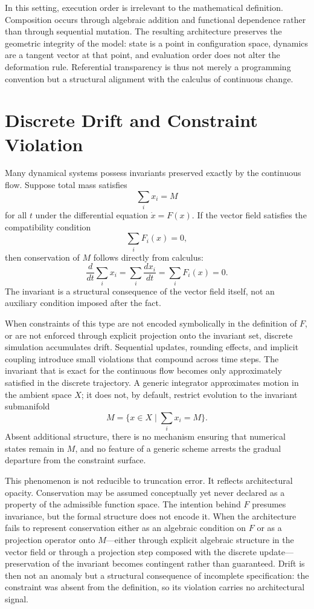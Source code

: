 \documentclass[12pt]{book}
\begin{document}
In this setting, execution order is irrelevant to the mathematical
definition. Composition occurs through algebraic addition and
functional dependence rather than through sequential mutation. The
resulting architecture preserves the geometric integrity of the model:
state is a point in configuration space, dynamics are a tangent vector
at that point, and evaluation order does not alter the deformation
rule. Referential transparency is thus not merely a programming
convention but a structural alignment with the calculus of continuous
change.

\section{Discrete Drift and Constraint Violation}

Many dynamical systems possess invariants preserved exactly by the continuous
flow. Suppose total mass satisfies
\[
  \sum_i x_i = M
\]
for all $t$ under the differential equation $\dot{x} = F(x)$. If the vector
field satisfies the compatibility condition
\[
  \sum_i F_i(x) = 0,
\]
then conservation of $M$ follows directly from calculus:
\[
  \frac{d}{dt}\sum_i x_i
  = \sum_i \frac{dx_i}{dt}
  = \sum_i F_i(x)
  = 0.
\]
The invariant is a structural consequence of the vector field itself, not an
auxiliary condition imposed after the fact.

When constraints of this type are not encoded symbolically in the definition
of $F$, or are not enforced through explicit projection onto the invariant set,
discrete simulation accumulates drift. Sequential updates, rounding effects,
and implicit coupling introduce small violations that compound across time
steps. The invariant that is exact for the continuous flow becomes only
approximately satisfied in the discrete trajectory. A generic integrator
approximates motion in the ambient space $X$; it does not, by default,
restrict evolution to the invariant submanifold
\[
  M = \bigl\{ x \in X \mid {\textstyle\sum_i} x_i = M \bigr\}.
\]
Absent additional structure, there is no mechanism ensuring that numerical
states remain in $M$, and no feature of a generic scheme arrests the
gradual departure from the constraint surface.

This phenomenon is not reducible to truncation error. It reflects
architectural opacity. Conservation may be assumed conceptually yet never
declared as a property of the admissible function space. The intention behind
$F$ presumes invariance, but the formal structure does not encode it. When
the architecture fails to represent conservation either as an algebraic
condition on $F$ or as a projection operator onto $M$---either through
explicit algebraic structure in the vector field or through a projection step
composed with the discrete update---preservation of the invariant becomes
contingent rather than guaranteed. Drift is then not an anomaly but a
structural consequence of incomplete specification: the constraint was absent
from the definition, so its violation carries no architectural signal.
\end{document}
